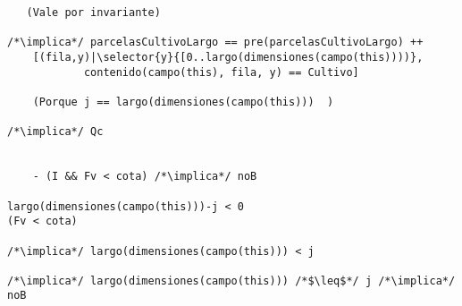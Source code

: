 \begin{lstlisting}
   (Vale por invariante)

/*\implica*/ parcelasCultivoLargo == pre(parcelasCultivoLargo) ++ 
    [(fila,y)|\selector{y}{[0..largo(dimensiones(campo(this))))}, 
    		contenido(campo(this), fila, y) == Cultivo]

	(Porque j == largo(dimensiones(campo(this)))  )

/*\implica*/ Qc

	
    - (I && Fv < cota) /*\implica*/ noB
    
largo(dimensiones(campo(this)))-j < 0
(Fv < cota)

/*\implica*/ largo(dimensiones(campo(this))) < j

/*\implica*/ largo(dimensiones(campo(this))) /*$\leq$*/ j /*\implica*/ noB

\end{lstlisting}


